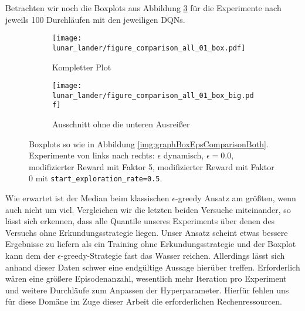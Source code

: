 Betrachten wir noch die Boxplots aus Abbildung \ref{img:lunarComparisonAllBox01Both} für die Experimente nach jeweils 100 Durchläufen mit den jeweiligen DQNs.
\begin{figure}[h!]
    \centering
    \begin{subfigure}[b]{0.7\textwidth}
        \texttt{[image: lunar\_lander/figure\_comparison\_all\_01\_box.pdf]}
        \caption{Kompletter Plot}
        \label{img:lunarComparisonAllBox01}
    \end{subfigure}
    \begin{subfigure}[b]{0.7\textwidth}
        \texttt{[image: lunar\_lander/figure\_comparison\_all\_01\_box\_big.pdf]}
        \caption{Ausschnitt ohne die unteren Ausreißer}
        \label{img:lunarComparisonAllBox01Big}
    \end{subfigure}
    \caption{Boxplots so wie in Abbildung \ref{img:graphBoxEpsComparisonBoth}. Experimente von links nach rechts: $ \epsilon $ dynamisch, $ \epsilon = 0.0 $, modifizierter Reward mit Faktor 5, modifizierter Reward mit Faktor 0 mit \texttt{start_exploration_rate=0.5}.}
    \label{img:lunarComparisonAllBox01Both}
\end{figure}
Wie erwartet ist der Median beim klassischen $ \epsilon $-greedy Ansatz am größten, wenn auch nicht um viel. Vergleichen wir die letzten beiden Versuche miteinander, so lässt sich erkennen, dass alle Quantile unseres Experiments über denen des Versuchs ohne Erkundungsstrategie liegen. Unser Ansatz scheint etwas bessere Ergebnisse zu liefern als ein Training ohne Erkundungsstrategie und der Boxplot kann dem der $ \epsilon $-greedy-Strategie fast das Wasser reichen. Allerdings lässt sich anhand dieser Daten schwer eine endgültige Aussage hierüber treffen. Erforderlich wären eine größere Episodenanzahl, wesentlich mehr Iteration pro Experiment und weitere Durchläufe zum Anpassen der Hyperparameter. Hierfür fehlen uns für diese Domäne im Zuge dieser Arbeit die erforderlichen Rechenressourcen.